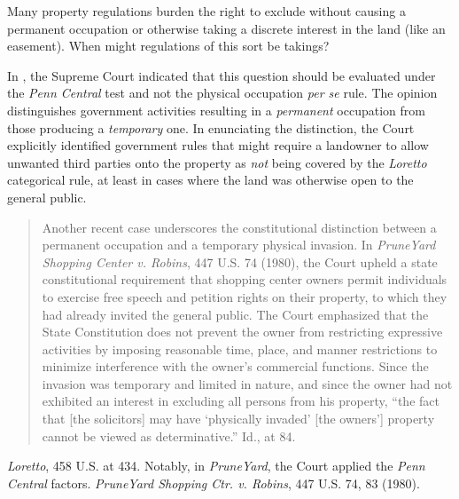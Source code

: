Many property regulations burden the right to exclude without causing a
permanent occupation or otherwise taking a discrete interest in the land (like
an easement). When might regulations of this sort be takings? 

In
, the Supreme Court indicated that
this question should be
evaluated under the \textit{Penn Central} test and not the physical occupation
\textit{per se} rule. The opinion distinguishes government activities resulting
in a \textit{permanent} occupation from those producing a \textit{temporary}
one. In enunciating the distinction, the Court explicitly identified government
rules that might require a landowner to allow unwanted third parties onto the
property as \textit{not} being covered by the \textit{Loretto} categorical rule,
at least in cases where the land was otherwise open to the general public.
\begin{quote}
Another recent case underscores the constitutional distinction between a
permanent occupation and a temporary physical invasion. In \textit{PruneYard
Shopping Center v. Robins}, 447 U.S. 74 (1980), the Court upheld a state
constitutional requirement that shopping center owners permit individuals to
exercise free speech and petition rights on their property, to which they had
already invited the general public. The Court emphasized that the State
Constitution does not prevent the owner from restricting expressive activities
by imposing reasonable time, place, and manner restrictions to minimize
interference with the owner's commercial functions. Since the invasion was
temporary and limited in nature, and since the owner had not exhibited an
interest in excluding all persons from his property, ``the fact that [the
solicitors] may have `physically invaded' [the owners'] property cannot be
viewed as determinative.'' Id., at 84.
\end{quote}
\emph{Loretto}, 458 U.S. at 434.
Notably, in \textit{PruneYard}, the Court applied the \textit{Penn Central}
factors. \emph{PruneYard Shopping Ctr. v. Robins}, 447 U.S. 74, 83 (1980).


